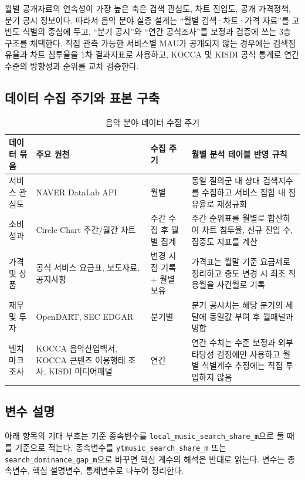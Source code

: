 \documentclass[11pt,a4paper]{report}
\begin{document}
월별 공개자료의 연속성이 가장 높은 축은 검색 관심도, 차트 진입도, 공개 가격정책, 분기 공시 정보이다. 따라서 음악 분야 실증 설계는 ``월별 검색·차트·가격 자료''를 고빈도 식별의 중심에 두고, ``분기 공시''와 ``연간 공식조사''를 보정과 검증에 쓰는 3층 구조를 채택한다. 직접 관측 가능한 서비스별 MAU가 공개되지 않는 경우에는 검색점유율과 차트 침투율을 1차 결과지표로 사용하고, KOCCA 및 KISDI 공식 통계로 연간 수준의 방향성과 순위를 교차 검증한다.

\subsection{데이터 수집 주기와 표본 구축}
\begin{table}[H]
  \centering
  \small
  \caption{음악 분야 데이터 수집 주기}\label{tab:music_data_cycle}
  \begin{tabular}{L{2.6cm}L{2.6cm}L{2.0cm}L{6.0cm}}
    \toprule
    데이터 묶음 & 주요 원천 & 수집 주기 & 월별 분석 테이블 반영 규칙 \\
    \midrule
    서비스 관심도 & NAVER DataLab API & 월별 & 동일 질의군 내 상대 검색지수를 수집하고 서비스 집합 내 점유율로 재정규화 \\
    소비성과 & Circle Chart 주간/월간 차트 & 주간 수집 후 월별 집계 & 주간 순위표를 월별로 합산하여 차트 침투율, 신규 진입 수, 집중도 지표를 계산 \\
    가격 및 상품 & 공식 서비스 요금표, 보도자료, 공지사항 & 변경 시점 기록 + 월별 보유 & 가격표는 월말 기준 요금제로 정리하고 중도 변경 시 최초 적용월을 사건월로 기록 \\
    재무 및 투자 & OpenDART, SEC EDGAR & 분기별 & 분기 공시치는 해당 분기의 세 달에 동일값 부여 후 월패널과 병합 \\
    벤치마크 조사 & KOCCA 음악산업백서, KOCCA 콘텐츠 이용행태 조사, KISDI 미디어패널 & 연간 & 연간 수치는 수준 보정과 외부타당성 검정에만 사용하고 월별 식별계수 추정에는 직접 투입하지 않음 \\
    \bottomrule
  \end{tabular}
\end{table}

\subsection{변수 설명}
아래 항목의 기대 부호는 기준 종속변수를 \nolinkurl{local_music_search_share_m}으로 둘 때를 기준으로 적는다. 종속변수를 \texttt{ytmusic\_search\_share\_m} 또는 \texttt{search\_dominance\_gap\_m}으로 바꾸면 핵심 계수의 해석은 반대로 읽는다. 변수는 종속변수, 핵심 설명변수, 통제변수로 나누어 정리한다.
\end{document}
